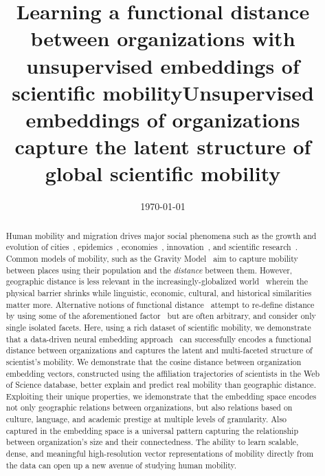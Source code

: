 \documentclass[12pt]{article} %
\begin{document}
\title{Learning a functional distance between organizations with unsupervised embeddings of scientific mobility}
\title{Unsupervised embeddings of organizations capture the latent structure of global scientific mobility} %
\date{\today}
\maketitle %

%
%

\begin{abstract}


Human mobility and migration drives major social phenomena such as the growth and evolution of cities~\autocite{wef2017migration, curiel2018citygravity},  epidemics~\autocite{kraemer2020covid, truscott2012epidemicgravity, xia2005measlesgravity}, economies~\autocite{kaluza2010cargo, kerr2011immigration}, innovation~\autocite{kaiser2018innovation, armano2017innovation},  and scientific research~\autocite{sugimoto2017mostimpact, petersen2018multiscale, franzoni2014advantage, morgan2018prestige, rodrigues2016mobility}. 
Common models of mobility, such as the Gravity Model~\autocite{zipf1946gravity, xia2005measlesgravity, jung2008highwaygravity, barbosa2018human, curiel2018citygravity, lewer2008immigrationgravity, hong2016busgravity, truscott2012epidemicgravity, xia2005measlesgravity} aim to capture mobility between places using their population and the \textit{distance} between them.
However, geographic distance is less relevant in the increasingly-globalized world~\autocite{czaika2018migration, czaika2018globalisation, buchan2009globalization, altbach2004globalization} wherein the physical barrier shrinks while linguistic, economic, cultural, and historical similarities matter more.
Alternative notions of functional distance~\autocite{brown1970migration, brown1970functional, kim2018functional} attempt to re-define distance by using some of the aforementioned factor~\autocite{boschma2005proximity,  brown1970functional, brown1970migration, kim2018functional} but are often arbitrary, and consider only single isolated facets. 
Here, using a rich dataset of scientific mobility, we demonstrate that a data-driven neural embedding approach~\autocite{mikolov2013word2vec} can successfully encodes a functional distance between organizations and captures the latent and multi-faceted structure of scientist's mobility.
We demonstrate that the cosine distance between organization embedding vectors, constructed using the affiliation trajectories of scientists in the Web of Science database, better explain and predict real mobility than geographic distance. 
Exploiting their unique properties, we idemonstrate that the embedding space encodes not only geographic relations between organizations, but also relations based on culture, language, and academic prestige at multiple levels of granularity.
Also captured in the embedding space is a universal pattern capturing the relationship between organization's size and their connectedness.
The ability to learn scalable, dense, and meaningful high-resolution vector representations of mobility directly from the data can open up a new avenue of studying human mobility.

\end{abstract}
\end{document}
